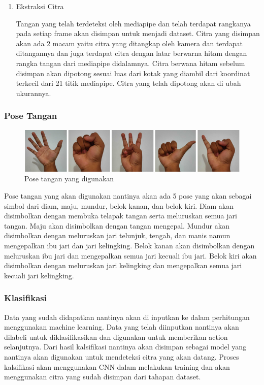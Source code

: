 \begin{enumerate}
  \item Ekstraksi Citra \par
  Tangan yang telah terdeteksi oleh mediapipe dan telah terdapat rangkanya pada setiap frame akan disimpan untuk menjadi dataset. Citra yang disimpan akan ada 2 macam yaitu citra yang ditangkap oleh kamera dan terdapat ditangannya dan juga terdapat citra dengan latar berwarna hitam dengan rangka tangan dari mediapipe didalamnya. Citra berwana hitam sebelum disimpan akan dipotong sesuai luas dari kotak yang diambil dari koordinat terkecil dari 21 titik mediapipe. Citra yang telah dipotong akan di ubah ukurannya.
\end{enumerate}

\subsubsection{Pose Tangan}
  
  \begin{figure}[!h]
    \centering
    \includegraphics[width=1\linewidth]{gambar/pose.png}
    \caption{Pose tangan yang digunakan}
    \label{fig:gambarpose}
  \end{figure}

  Pose tangan yang akan digunakan nantinya akan ada 5 pose yang akan sebagai simbol dari diam, maju, mundur, belok kanan, dan belok kiri. Diam akan disimbolkan dengan membuka telapak tangan serta meluruskan semua jari tangan. Maju akan disimbolkan dengan tangan mengepal. Mundur akan disimbolkan dengan meluruskan jari telunjuk, tengah, dan manis namun mengepalkan ibu jari dan jari kelingking. Belok kanan akan disimbolkan dengan meluruskan ibu jari dan mengepalkan semua jari kecuali ibu jari. Belok kiri akan disimbolkan dengan meluruskan jari kelingking dan mengepalkan semua jari kecuali jari kelingking.

\subsubsection{Klasifikasi}
  Data yang sudah didapatkan nantinya akan di inputkan ke dalam perhitungan menggunakan machine learning. Data yang telah diinputkan nantinya akan dilabeli untuk diklasifikasikan dan digunakan untuk memberikan action selanjutnya. Dari hasil kalsifikasi nantinya akan disimpan sebagai model yang nantinya akan digunakan untuk mendeteksi citra yang akan datang. Proses kalsifikasi akan menggunakan CNN dalam melakukan training dan akan menggunakan citra yang sudah disimpan dari tahapan dataset. 
  
